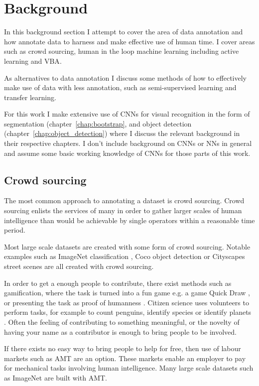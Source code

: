 \section {Background}

In this background section I attempt to cover the area of data annotation and how annotate data to harness and make effective use of human time. I cover areas such as crowd sourcing, human in the loop machine learning including active learning and \gls{VBA}.

As alternatives to data annotation I discuss some methods of how to effectively make use of data with less annotation, such as semi-supervised learning and transfer learning. 

For this work I make extensive use of \gls{CNN}s for visual recognition in the form of segmentation (chapter~\ref{chap:bootstrap}, and object detection (chapter~\ref{chap:object_detection}) where I discuss the relevant background in their respective chapters. I don't include background on \gls{CNN}s or \gls{NN}s in general and assume some basic working knowledge of \gls{CNN}s for those parts of this work.


\subsection {Crowd sourcing}

The most common approach to annotating a dataset is crowd sourcing. Crowd sourcing enlists the services of many in order to gather larger scales of human intelligence than would be achievable by single operators within a reasonable time period.

Most large scale datasets are created with some form of crowd sourcing. Notable examples such as ImageNet classification \cite{JiaDeng2009}, Coco object detection \cite{Lin2014} or Cityscapes street scenes \cite{Cordts2016} are all created with crowd sourcing. 

In order to get a enough people to contribute, there exist methods such as gamification, where the task is turned into a fun game  e.g. a game Quick Draw \cite{Ha2017}, or presenting the task as proof of humanness \cite{Goodfellow2013a}. Citizen science uses volunteers to perform tasks, for example to count penguins, identify species or identify planets \cite{Simpson2014, Masters2016}. Often the feeling of contributing to something meaningful, or the novelty of having your name as a contributor is enough to bring people to be involved.

If there exists no easy way to bring people to help for free, then use of labour markets such as \gls{AMT} are an option. These markets enable an employer to pay for mechanical tasks involving human intelligence. Many large scale datasets such as ImageNet \cite{Russakovsky2015} are built with \gls{AMT}. 


